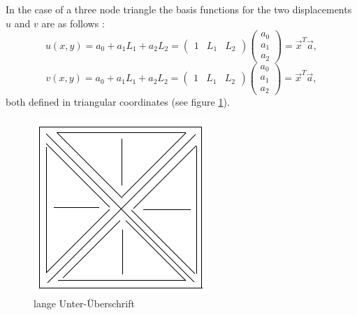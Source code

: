   In the case of a three node triangle the basis functions for the two displacements $u$ and $v$ are as follows \cite{steinke2005finite}:
  \begin{equation}\label{eq:t3_ansatzU}
  u(x,y) = a_0 + a_1L_1 + a_2L_2 = \begin{pmatrix}
  1 & L_1 & L_2
  \end{pmatrix} \begin{pmatrix}
  a_0 \\ a_1 \\ a_2
  \end{pmatrix} = \vec{x}^T \vec{a},
  \end{equation}
  \begin{equation}\label{eq:t3_ansatzV}
  v(x,y) = a_0 + a_1L_1 + a_2L_2 = \begin{pmatrix}
  1 & L_1 & L_2
  \end{pmatrix} \begin{pmatrix}
  a_0 \\ a_1 \\ a_2
  \end{pmatrix} = \vec{x}^T \vec{a},
  \end{equation}
  both defined in triangular coordinates (see figure \ref{fig:platzhalter}).
  \begin{figure}
  	\centering
  	\includegraphics[width=0.7\linewidth]{figures/platzhalter}
  	\caption[kurze Unter-Überschrift]{lange Unter-Überschrift}
  	\label{fig:platzhalter}
  \end{figure}
